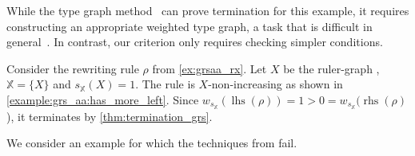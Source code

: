 While the type graph method~\cite{bruggink2014termination, bruggink2015proving,endrullis2024generalized_arxiv_v2} can prove termination for this example, it requires constructing an appropriate weighted type graph, a task that is difficult in general~\cite[]{bruggink2015proving}. 
In contrast, our criterion only requires checking simpler conditions.
\begin{example}
    \label{ex:termination:grsaa}
    Consider the rewriting rule $\rho$ from \autoref{ex:grsaa_rx}. Let $X$ be the ruler-graph , $\mathbb{X} = \{X\}$ and $s_\mathbb{X}(X) = 1$. The rule is $X$-non-increasing as shown in \autoref{example:grs_aa:has_more_left}. 
    Since \(w_{s_\mathbb{X}}(\operatorname{lhs}(\rho)) = 1 > 0 = w_{s_\mathbb{X}}(\operatorname{rhs}(\rho)\)),
    it terminates by \autoref{thm:termination_grs}.
\end{example}
We consider an example for which the techniques from \cite{bruggink2014termination,bruggink2015proving,endrullis2024generalized_arxiv_v2,plump2018modular,overbeek2024termination_lmcs} fail.
    
